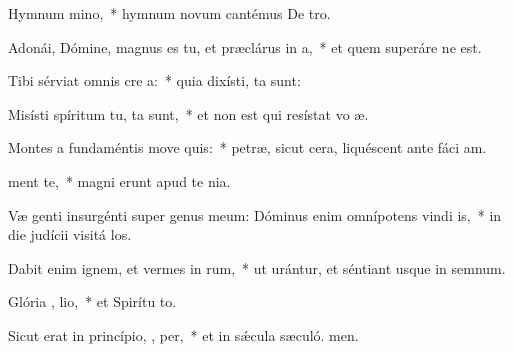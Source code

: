 \item Hymnum  mino,~* hymnum novum cantémus De tro.
\item Adonái, Dómine, magnus es tu, et præclárus in  a,~* et quem superáre ne est.
\item Tibi sérviat omnis cre a:~* quia dixísti,  ta sunt:
\item Misísti spíritum tu,  ta sunt,~* et non est qui resístat vo æ.
\item Montes a fundaméntis move  quis:~* petræ, sicut cera, liquéscent ante fáci am.
\item {}  ment te,~* magni erunt apud te  nia.
\item Væ genti insurgénti super genus meum: Dóminus enim omnípotens vindi  is,~* in die judícii visitá los.
\item Dabit enim ignem, et vermes in  rum,~* ut urántur, et séntiant usque in semnum.
\item Glória ,  lio,~* et Spirítu to.
\item Sicut erat in princípio,  ,  per,~* et in sǽcula sæculó. men.
